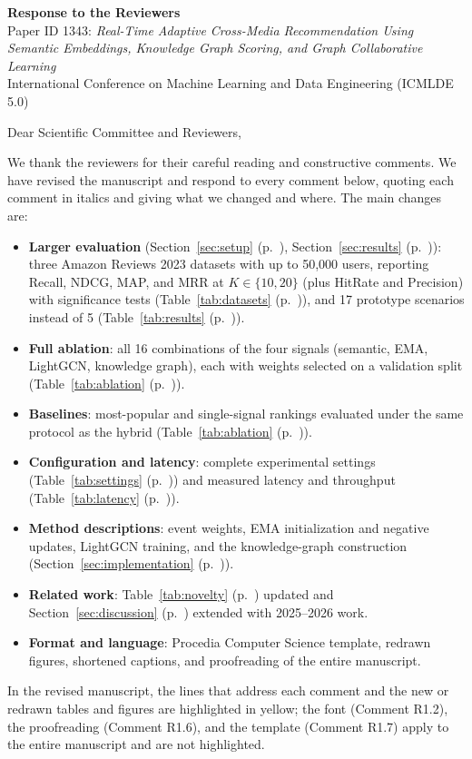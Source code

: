 \documentclass[10pt]{article}
\newcommand{\sect}[1]{Section~\ref{#1} (p.~\pageref{#1})}
\newcommand{\tabl}[1]{Table~\ref{#1} (p.~\pageref{#1})}
\begin{document}
\begin{center}
{\large\textbf{Response to the Reviewers}}\\[4pt]
Paper ID 1343: \textit{Real-Time Adaptive Cross-Media Recommendation Using Semantic Embeddings, Knowledge Graph Scoring, and Graph Collaborative Learning}\\[2pt]
International Conference on Machine Learning and Data Engineering (ICMLDE 5.0)
\end{center}

Dear Scientific Committee and Reviewers,

We thank the reviewers for their careful reading and constructive comments. We have revised the manuscript and respond to every comment below, quoting each comment in italics and giving what we changed and where. The main changes are:
\begin{itemize}
  \item \textbf{Larger evaluation} (\sect{sec:setup}, \sect{sec:results}): three Amazon Reviews 2023 datasets with up to 50,000 users, reporting Recall, NDCG, MAP, and MRR at $K\in\{10,20\}$ (plus HitRate and Precision) with significance tests (\tabl{tab:datasets}), and 17 prototype scenarios instead of 5 (\tabl{tab:results}).
  \item \textbf{Full ablation}: all 16 combinations of the four signals (semantic, EMA, LightGCN, knowledge graph), each with weights selected on a validation split (\tabl{tab:ablation}).
  \item \textbf{Baselines}: most-popular and single-signal rankings evaluated under the same protocol as the hybrid (\tabl{tab:ablation}).
  \item \textbf{Configuration and latency}: complete experimental settings (\tabl{tab:settings}) and measured latency and throughput (\tabl{tab:latency}).
  \item \textbf{Method descriptions}: event weights, EMA initialization and negative updates, LightGCN training, and the knowledge-graph construction (\sect{sec:implementation}).
  \item \textbf{Related work}: \tabl{tab:novelty} updated and \sect{sec:discussion} extended with 2025--2026 work.
  \item \textbf{Format and language}: Procedia Computer Science template, redrawn figures, shortened captions, and proofreading of the entire manuscript.
\end{itemize}
In the revised manuscript, the lines that address each comment and the new or redrawn tables and figures are highlighted in yellow; the font (Comment R1.2), the proofreading (Comment R1.6), and the template (Comment R1.7) apply to the entire manuscript and are not highlighted.
\end{document}
